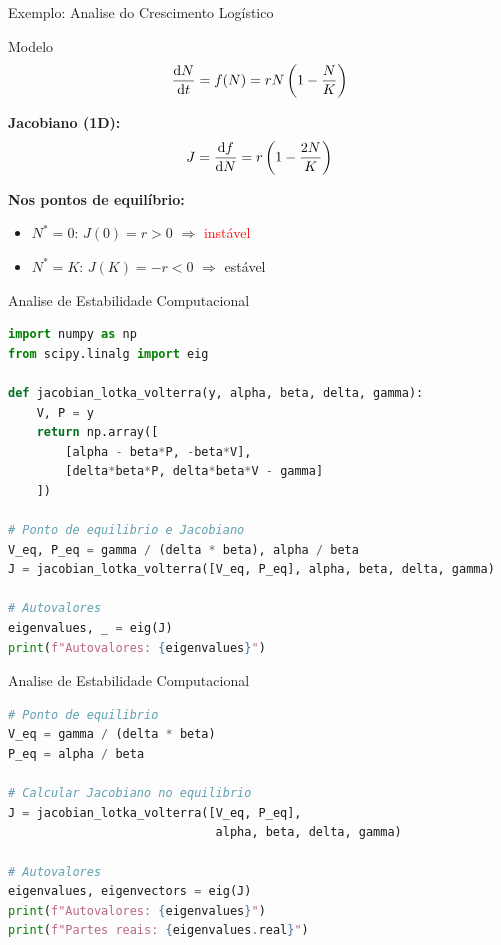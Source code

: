 \begin{frame}{Exemplo: Analise do Crescimento Logístico}
\begin{block}{Modelo}
\begin{equation*}
\frac{\mathrm{d} N}{\mathrm{d} t} = f(N) = rN\left(1 - \frac{N}{K}\right)
\end{equation*}
\end{block}

\textbf{Jacobiano (1D):}
\begin{equation*}
J = \frac{\mathrm{d} f}{\mathrm{d} N} = r\left(1 - \frac{2N}{K}\right)
\end{equation*}

\textbf{Nos pontos de equilíbrio:}
\begin{itemize}
    \item $N^* = 0$: $J(0) = r > 0$ $\Rightarrow$ \textcolor{red}{instável}
    \item $N^* = K$: $J(K) = -r < 0$ $\Rightarrow$ \textcolor{verdeacido}{estável}
\end{itemize}

\end{frame}

\begin{frame}{Analise de Estabilidade Computacional}
\begin{lstlisting}[language=Python, caption=Calculo do Jacobiano e autovalores, basicstyle=\ttfamily\footnotesize]
import numpy as np
from scipy.linalg import eig

def jacobian_lotka_volterra(y, alpha, beta, delta, gamma):
    V, P = y
    return np.array([
        [alpha - beta*P, -beta*V],
        [delta*beta*P, delta*beta*V - gamma]
    ])

# Ponto de equilibrio e Jacobiano
V_eq, P_eq = gamma / (delta * beta), alpha / beta
J = jacobian_lotka_volterra([V_eq, P_eq], alpha, beta, delta, gamma)

# Autovalores
eigenvalues, _ = eig(J)
print(f"Autovalores: {eigenvalues}")
\end{lstlisting}
\end{frame}

\begin{frame}[fragile]{Analise de Estabilidade Computacional}
\begin{lstlisting}[language=Python, caption=Analise de autovalores]
# Ponto de equilibrio
V_eq = gamma / (delta * beta)
P_eq = alpha / beta

# Calcular Jacobiano no equilibrio
J = jacobian_lotka_volterra([V_eq, P_eq],
                             alpha, beta, delta, gamma)

# Autovalores
eigenvalues, eigenvectors = eig(J)
print(f"Autovalores: {eigenvalues}")
print(f"Partes reais: {eigenvalues.real}")
\end{lstlisting}
\end{frame}

